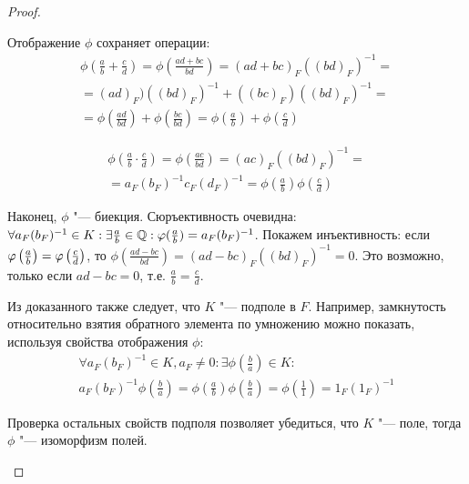 \begin{proof}
\begin{enumerate}
		Отображение $\phi$ сохраняет операции:
		\begin{multline*}
		\phi\left(\frac{a}{b} + \frac{c}{d}\right) = \phi\left(\frac{ad + bc}{bd}\right) = (ad + bc)_F((bd)_F)^{-1} =\\
		= (ad)_F)((bd)_F)^{-1} + ((bc)_F)((bd)_F)^{-1} =\\ = \phi\left(\frac{ad}{bd}\right) + \phi\left(\frac{bc}{bd}\right) = \phi\left(\frac{a}{b}\right) + \phi\left(\frac{c}{d}\right)
		\end{multline*}
		
		\begin{multline*}
		\phi\left(\frac{a}{b}\cdot\frac{c}{d}\right) = \phi\left(\frac{ac}{bd}\right) = (ac)_F((bd)_F)^{-1} =\\
		= a_F(b_F)^{-1}c_F(d_F)^{-1} = \phi\left(\frac{a}{b}\right)\phi\left(\frac{c}{d}\right)
		\end{multline*}
			
		Наконец, $\phi$ "--- биекция. Сюръективность очевидна: $\forall a_F(b_F)^{-1} \hm{\in} K: \exists \frac{a}{b} \in \mathbb{Q}: \phi(\frac{a}{b}) = a_F(b_F)^{-1}$. Покажем инъективность: если $\phi\left(\frac{a}{b}\right) \hm{=} \phi\left(\frac{c}{d}\right)$, то $\phi\left(\frac{ad - bc}{bd}\right) = (ad - bc)_F((bd)_F)^{-1} = 0$. Это возможно, только если $ad - bc = 0$, т.\:е. $\frac{a}{b} = \frac{c}{d}$.
		
		Из доказанного также следует, что $K$ "--- подполе в $F$. Например, замкнутость относительно взятия обратного элемента по умножению можно показать, используя свойства отображения $\phi$:
			\begin{multline*}
			\forall a_F(b_F)^{-1} \in K, a_F \ne 0 : \exists \phi\left(\frac{b}{a}\right) \in K:\\
			a_F(b_F)^{-1}\phi\left(\frac{b}{a}\right) = \phi\left(\frac{a}{b}\right)\phi\left(\frac{b}{a}\right) = \phi\left(\frac{1}{1}\right) = 1_F(1_F)^{-1}
			\end{multline*}
			
		Проверка остальных свойств подполя позволяет убедиться, что $K$ "--- поле, тогда $\phi$ "--- изоморфизм полей.
	\end{enumerate}
\end{proof}